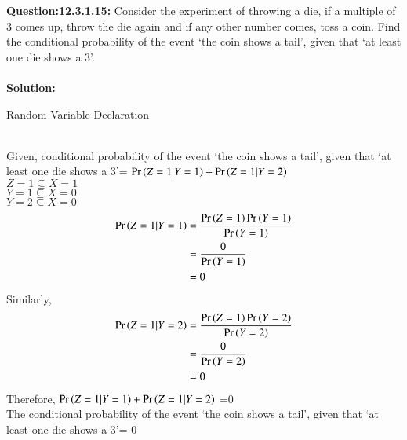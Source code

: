 \documentclass[journal,12pt,onecolumn]{IEEEtran}
\begin{document}
\maketitle
\bigskip
\textbf{Question:12.3.1.15:} Consider the experiment of throwing a die, if a multiple of 3 comes up, throw the die again and if any other number comes, toss a coin. Find the conditional probability of the event ‘the coin shows a tail’, given that ‘at least one die shows a 3’.
\\
\\
\textbf{Solution:} 
\begin{table}[htbp]
\centering
\caption{Random Variable Declaration}

\label{table:1}
\end{table}
\bigskip
\\
Given,
conditional probability of the event ‘the coin shows a tail’, given that ‘at least one die shows a 3’= $\Pr\left(Z=1 | Y=1\right) + \Pr\left(Z=1 | Y=2\right)$ \\
$Z=1 \subseteq X=1$ \\
$Y=1 \subseteq X=0$ \\
$Y=2 \subseteq X=0$ 
\\
\begin{align}
\Pr\left(Z=1|Y=1\right) &= \frac{\Pr\left(Z=1\right)\Pr\left(Y=1\right)}{\Pr\left(Y=1\right)}  \\
&= \frac{0}{\Pr\left(Y=1\right)} \\
&=0 
\end{align}
Similarly, \\

\begin{align}
\Pr\left(Z=1 | Y=2\right) &=  \frac{\Pr\left(Z=1\right)\Pr\left(Y=2\right)}{\Pr\left(Y=2\right)} \\
&= \frac{0}{\Pr\left(Y=2\right)} \\
&= 0
\end{align}
Therefore, $\Pr\left(Z=1 | Y=1\right) + \Pr\left(Z=1 | Y=2\right)$ =0 \\
The conditional probability of the event ‘the coin shows a tail’, given that ‘at least one die shows a 3’= 0
\end{document}
